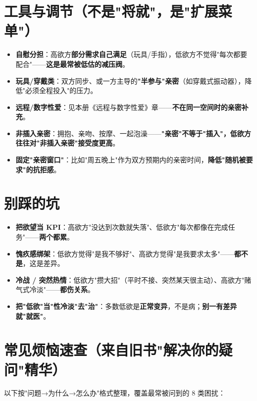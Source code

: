 \documentclass[12pt,UTF8,openany]{ctexbook}
\begin{document}
\section{工具与调节（不是"将就"，是"扩展菜单"）}
\begin{itemize}[leftmargin=2em,itemsep=0.3em]
  \item \textbf{自慰分担}：高欲方\textbf{部分需求自己满足}（玩具/手指），低欲方不觉得"每次都要配合"——\textbf{这是最常被低估的减压阀}。
  \item \textbf{玩具/穿戴类}：双方同步、或一方主导的\textbf{"半参与"亲密}（如穿戴式振动器），降低"必须全程投入"的压力。
  \item \textbf{远程/数字性爱}：见本册《远程与数字性爱》章——\textbf{不在同一空间时的亲密补充}。
  \item \textbf{非插入亲密}：拥抱、亲吻、按摩、一起泡澡——\textbf{"亲密"不等于"插入"，低欲方往往对"非插入亲密"接受度更高}。
  \item \textbf{固定"亲密窗口"}：比如"周五晚上"作为双方预期内的亲密时间，\textbf{降低"随机被要求"的抗拒感}。
\end{itemize}

\section{别踩的坑}
\begin{itemize}[leftmargin=2em,itemsep=0.3em]
  \item \textbf{把欲望当 KPI}：高欲方"没达到次数就失落"、低欲方"每次都像在完成任务"——\textbf{两个都累}。
  \item \textbf{愧疚感绑架}：低欲方觉得"是我不够好"、高欲方觉得"是我要求太多"——\textbf{都不是}，这是差异。
  \item \textbf{冷战 / 突然热情}：低欲方"攒大招"（平时不接、突然某天很主动）、高欲方"赌气式冷淡"——\textbf{都伤关系}。
  \item \textbf{把"低欲"当"性冷淡"去"治"}：多数低欲是\textbf{正常变异}，不是病；\textbf{别一有差异就"就医"}。
\end{itemize}

\section{常见烦恼速查（来自旧书"解决你的疑问"精华）}

以下按"问题→为什么→怎么办"格式整理，覆盖最常被问到的 8 类困扰：
\end{document}
